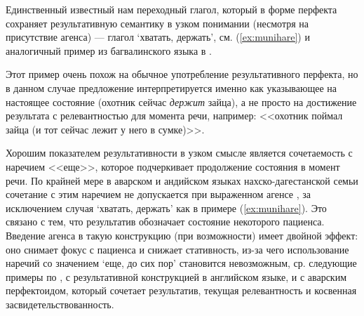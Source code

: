 Единственный известный нам переходный глагол, который в форме перфекта сохраняет результативную семантику в узком понимании (несмотря на присутствие агенса) --- глагол `хватать, держать', см. (\ref{ex:munihare}) и аналогичный пример из багвалинского языка в \citep[450]{tatevosov2001}.


Этот пример очень похож на обычное употребление результативного перфекта, но в данном случае предложение интерпретируется именно как указывающее на настоящее состояние (охотник сейчас \textit{держит} зайца), а не просто на достижение результата с релевантностью для момента речи, например: <<охотник поймал зайца (и тот сейчас лежит у него в сумке)>>.
\par Хорошим показателем результативности в узком смысле является сочетаемость с наречием <<еще>>, которое подчеркивает продолжение состояния в момент речи. По крайней мере в аварском и андийском языках нахско-дагестанской семьи сочетание с этим наречием не допускается при выраженном агенсе \citep{verhees2018}, за исключением случая `хватать, держать' как в примере (\ref{ex:munihare}). Это связано с тем, что результатив обозначает состояние некоторого пациенса. Введение агенса в такую конструкцию (при возможности) имеет двойной эффект: оно снимает фокус с пациенса и снижает стативность, из-за чего использование наречий со значением `еще, до сих пор' становится невозможным, ср. следующие примеры по \citep[263]{verhees2018}, с результативной конструкцией в английском языке, и с аварским перфектоидом, который сочетает результатив, текущая релевантность и косвенная засвидетельствованность.




